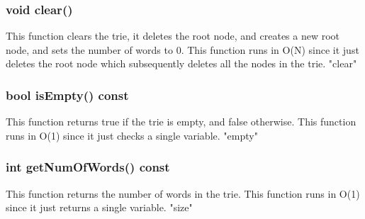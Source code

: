 \documentclass[a4paper]{article}
\begin{document}
\subsubsection{{\color{orange}void} {\color{draculapurple}clear}()}
This function clears the trie, it deletes the root node, and creates a new root node, and sets the number of words to 0. This function runs in {\color{lightblue}O(N)} since it just deletes the root node which subsequently deletes all the nodes in the trie.
{\color{GoldenYellow}"clear"}

\subsubsection{{\color{orange}bool} {\color{draculapurple}isEmpty}() {\color{GoldenYellow} const}}
This function returns true if the trie is empty, and false otherwise. This function runs in {\color{lightblue}O(1)} since it just checks a single variable.
{\color{GoldenYellow}"empty"}

\subsubsection{{\color{orange}int} {\color{draculapurple}getNumOfWords}() {\color{GoldenYellow} const}}
This function returns the number of words in the trie. This function runs in {\color{lightblue}O(1)} since it just returns a single variable.
{\color{GoldenYellow}"size"}
\end{document}
